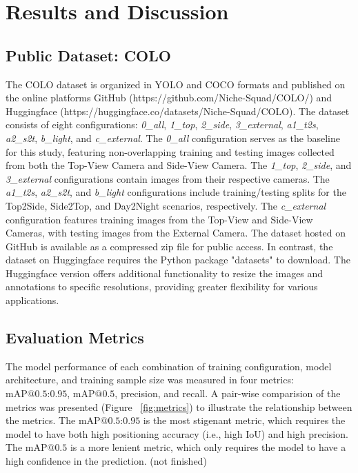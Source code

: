 \section{Results and Discussion}

\subsection*{Public Dataset: COLO}

The COLO dataset is organized in YOLO and COCO formats and published on the online platforms GitHub (https://github.com/Niche-Squad/COLO/) and Huggingface (https://huggingface.co/datasets/Niche-Squad/COLO). The dataset consists of eight configurations: \textit{0\_all}, \textit{1\_top}, \textit{2\_side}, \textit{3\_external}, \textit{a1\_t2s}, \textit{a2\_s2t}, \textit{b\_light}, and \textit{c\_external}. The \textit{0\_all} configuration serves as the baseline for this study, featuring non-overlapping training and testing images collected from both the Top-View Camera and Side-View Camera. The \textit{1\_top}, \textit{2\_side}, and \textit{3\_external} configurations contain images from their respective cameras. The \textit{a1\_t2s}, \textit{a2\_s2t}, and \textit{b\_light} configurations include training/testing splits for the Top2Side, Side2Top, and Day2Night scenarios, respectively. The \textit{c\_external} configuration features training images from the Top-View and Side-View Cameras, with testing images from the External Camera. The dataset hosted on GitHub is available as a compressed zip file for public access. In contrast, the dataset on Huggingface requires the Python package "datasets" \citep{} to download. The Huggingface version offers additional functionality to resize the images and annotations to specific resolutions, providing greater flexibility for various applications.


\subsection*{Evaluation Metrics}

The model performance of each combination of training configuration, model architecture, and training sample size was measured in four metrics: $\text{mAP@{0.5:0.95}}$, $\text{mAP@{0.5}}$, precision, and recall. A pair-wise comparision of the metrics was presented (Figure ~\ref{fig:metrics}) to illustrate the relationship between the metrics. The $\text{mAP@{0.5:0.95}}$ is the most stigenant metric, which requires the model to have both high positioning accuracy (i.e., high IoU) and high precision. The $\text{mAP@{0.5}}$ is a more lenient metric, which only requires the model to have a high confidence in the prediction. (not finished)

